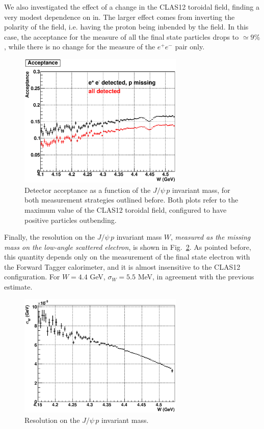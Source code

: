 We also investigated the effect of a change in the CLAS12 toroidal field, finding a very modest dependence on in. 
The larger effect comes from inverting the polarity of the field, i.e. having the proton being inbended by the field. In this case, the acceptance for the measure of all the final state particles drops to $\simeq 9\%$, while there is no change for the measure of the $e^+ e^-$ pair only.

\begin{figure}[tpb]
\center
\includegraphics[width=0.7\textwidth]{acceptanceNominal.eps}
\caption{\footnotesize \label{fig:5} Detector acceptance as a function of the  $J/\psi\, p$ invariant mass, for both measurement strategies outlined before. Both plots refer to the maximum value of the CLAS12 toroidal field, configured to have positive particles outbending. }
\end{figure}

Finally, the resolution on the $J/\psi\, p$ invariant mass $W$, \textit{measured as the missing mass on the low-angle scattered electron}, is shown in Fig.~\ref{fig:6}. As pointed before, this quantity depends only on the measurement of the final state electron with the Forward Tagger calorimeter, and it is almost insensitive to the CLAS12 configuration. For $W=4.4$ GeV, $\sigma_W=5.5$ MeV, in agreement with the previous estimate.

\begin{figure}[tpb]
\center
\includegraphics[width=0.7\textwidth]{resolutionW.eps}
\caption{\footnotesize \label{fig:6} Resolution on the  $J/\psi\, p$ invariant mass.}
\end{figure}








